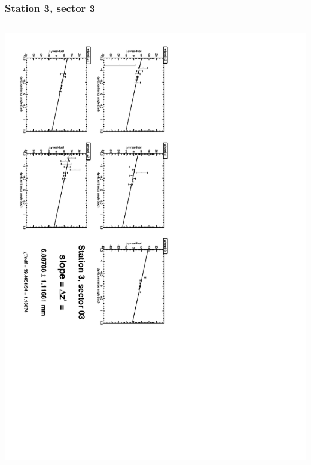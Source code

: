 \documentclass[compress]{beamer}
\begin{document}
\begin{frame}
\frametitle{Station 3, sector 3}
\begin{columns}
\includegraphics[height=\linewidth, angle=90]{zfits/zfit_3_03.pdf}


\end{columns}
\end{frame}
\end{document}
